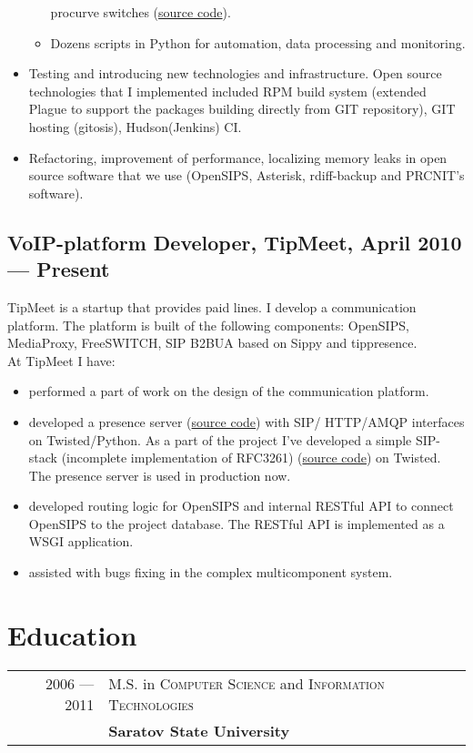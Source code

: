 \documentclass[a4paper,10pt]{article}
\begin{document}
\begin{itemize}
\begin{itemize}
procurve switches (\href{http://git.sgu.ru/?p=aaa\_hp.git;a=summary}{source
code}).
 \item Dozens scripts in Python for automation, data processing and monitoring.
 \end{itemize}
\item Testing and introducing new technologies and infrastructure. Open source
technologies that I implemented included RPM build system (extended Plague to
support the packages building directly from GIT repository), GIT hosting
(gitosis), Hudson(Jenkins) CI.
\item Refactoring, improvement of performance, localizing memory leaks in open
source software that we use (OpenSIPS, Asterisk, rdiff-backup and PRCNIT's
software).
\end{itemize}

\subsection{VoIP-platform Developer, TipMeet, April 2010 --- Present}
TipMeet is a startup that provides paid lines. I develop
a communication platform. The platform is built of the following components:
OpenSIPS, MediaProxy, FreeSWITCH, SIP B2BUA based on Sippy and
tippresence.\\
At TipMeet I have:
\begin{itemize}
\item performed a part of work on the design of the communication platform.
\item developed a presence server
(\href{http://github.com/tipmeet/tippresence}{source code}) with SIP\slash
HTTP\slash AMQP interfaces on Twisted\slash Python. As a part of the project
I've developed a simple SIP-stack (incomplete implementation of RFC3261)
(\href{http://github.com/tipmeet/tipsip}{source code}) on
Twisted. The presence server is used in production now.
\item developed routing logic for OpenSIPS and internal RESTful API
to connect OpenSIPS to the project database. The RESTful API is implemented as
a WSGI application.
\item assisted with bugs fixing in the complex multicomponent system.
\end{itemize}


\section{Education}
\begin{tabular}{rl}
2006 --- 2011& M.S. in \textsc{Computer Science} and \textsc{Information
Technologies} \\& \textbf{Saratov State University}
\end{tabular}
\end{document}
